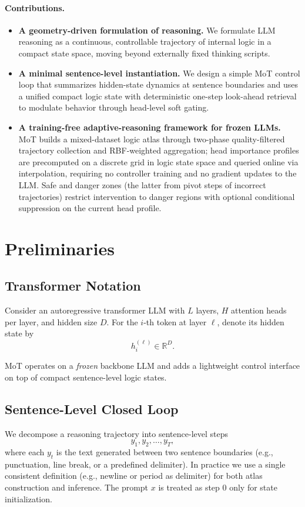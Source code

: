 \documentclass{article}
\newcommand{\R}{\mathbb{R}}
\begin{document}
\paragraph{Contributions.}
\begin{itemize}[leftmargin=1.3em, itemsep=0.2em]
    \item \textbf{A geometry-driven formulation of reasoning.} We formulate LLM reasoning as a continuous, controllable trajectory of internal logic in a compact state space, moving beyond externally fixed thinking scripts.
    \item \textbf{A minimal sentence-level instantiation.} We design a simple MoT control loop that summarizes hidden-state dynamics at sentence boundaries and uses a unified compact logic state with deterministic one-step look-ahead retrieval to modulate behavior through head-level soft gating.
    \item \textbf{A training-free adaptive-reasoning framework for frozen LLMs.} MoT builds a mixed-dataset logic atlas through two-phase quality-filtered trajectory collection and RBF-weighted aggregation; head importance profiles are precomputed on a discrete grid in logic state space and queried online via interpolation, requiring no controller training and no gradient updates to the LLM. Safe and danger zones (the latter from pivot steps of incorrect trajectories) restrict intervention to danger regions with optional conditional suppression on the current head profile.
\end{itemize}


\section{Preliminaries}
\label{sec:prelim}

\subsection{Transformer Notation}
Consider an autoregressive transformer LLM with $L$ layers, $H$ attention heads per layer, and hidden size $D$. 
For the $i$-th token at layer $\ell$, denote its hidden state by
\[
h^{(\ell)}_{i} \in \R^{D}.
\]

MoT operates on a \emph{frozen} backbone LLM and adds a lightweight control interface on top of compact sentence-level logic states.

\subsection{Sentence-Level Closed Loop}
We decompose a reasoning trajectory into sentence-level steps
\[
y_{1}, y_{2}, \dots, y_{T},
\]
where each $y_t$ is the text generated between two sentence boundaries (e.g., punctuation, line break, or a predefined delimiter). In practice we use a single consistent definition (e.g., newline or period as delimiter) for both atlas construction and inference. The prompt $x$ is treated as step $0$ only for state initialization.
\end{document}
